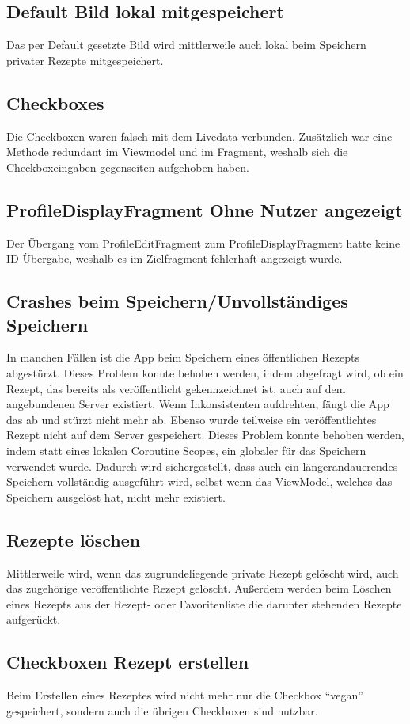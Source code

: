 \subsection{Default Bild lokal mitgespeichert}
Das per Default gesetzte Bild wird mittlerweile auch lokal beim Speichern privater Rezepte mitgespeichert.
\subsection{Checkboxes}
Die Checkboxen waren falsch mit dem Livedata verbunden. Zusätzlich war eine Methode redundant im Viewmodel und im Fragment, weshalb sich die Checkboxeingaben gegenseiten aufgehoben haben. 
\subsection{ProfileDisplayFragment Ohne Nutzer angezeigt}
Der Übergang vom ProfileEditFragment zum ProfileDisplayFragment hatte keine ID Übergabe, weshalb es im Zielfragment fehlerhaft angezeigt wurde. 
\subsection{Crashes beim Speichern/Unvollständiges Speichern}
In manchen Fällen ist die App beim Speichern eines öffentlichen Rezepts abgestürzt. Dieses Problem konnte behoben werden, indem abgefragt wird, ob ein Rezept, das bereits als veröffentlicht gekennzeichnet ist, auch auf dem angebundenen Server existiert. Wenn Inkonsistenten aufdrehten, fängt die App das ab und stürzt nicht mehr ab.
Ebenso wurde teilweise ein veröffentlichtes Rezept nicht auf dem Server gespeichert.
Dieses Problem konnte behoben werden, indem statt eines lokalen Coroutine Scopes, ein globaler für das Speichern verwendet wurde. Dadurch wird sichergestellt, dass auch ein längerandauerendes Speichern vollständig ausgeführt wird, selbst wenn das ViewModel, welches das Speichern ausgelöst hat, nicht mehr existiert.
\subsection{Rezepte löschen}
Mittlerweile wird, wenn das zugrundeliegende private Rezept gelöscht wird, auch das zugehörige veröffentlichte Rezept gelöscht. 
Außerdem werden beim Löschen eines Rezepts aus der Rezept- oder Favoritenliste die darunter stehenden Rezepte aufgerückt.
\subsection{Checkboxen Rezept erstellen}
Beim Erstellen eines Rezeptes wird nicht mehr nur die Checkbox "`vegan"' gespeichert, sondern auch die übrigen Checkboxen sind nutzbar.


